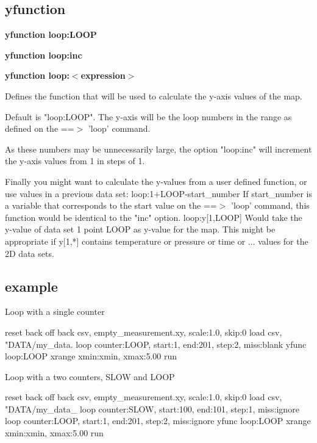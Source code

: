 \subsection*{yfunction}
{\bf yfunction loop:LOOP \par }
{\bf yfunction loop:inc \par }
{\bf yfunction loop:$ <$expression$> $ \par }
\par
\vspace{3pt}
Defines the function that will be used to calculate the 
y-axis values of the map. 
\par
Default is "loop:LOOP". The y-axis will be the loop numbers 
in the range as defined on the ==$> $ 'loop' command. 
\par
As these numbers may be unnecessarily large, the option 
"loop:inc" will increment the y-axis values from 1 in steps 
of 1. 
\par
Finally you might want to calculate the y-values from 
a user defined function, or use values in a previous 
data set: 
loop:1+LOOP-start\_number 
   If start\_number is a variable that corresponds to the 
   start value on the ==$> $ 'loop' command, this function 
   would be identical to the "inc" option. 
loop:y[1,LOOP] 
   Would take the y-value of data set 1 point LOOP as 
   y-value for the map. This might be appropriate if 
   y[1,*] contains temperature or pressure or time or ... 
   values for the 2D data sets. 
\subsection*{example}
\par
Loop with a single counter 
\begin{MacVerbatim}
reset
back off
back csv, empty_measurement.xy, scale:1.0, skip:0
load csv, "DATA/my_data.%
loop counter:LOOP, start:1, end:201, step:2, miss:blank
yfunc loop:LOOP
xrange xmin:xmin, xmax:5.00
run
\end{MacVerbatim}
Loop with a two counters, SLOW and LOOP 
\begin{MacVerbatim}
reset
back off
back csv, empty_measurement.xy, scale:1.0, skip:0
load csv, "DATA/my_data_%
loop counter:SLOW, start:100, end:101, step:1, miss:ignore
loop counter:LOOP, start:1, end:201, step:2, miss:ignore
yfunc loop:LOOP
xrange xmin:xmin, xmax:5.00
run
\end{MacVerbatim}
